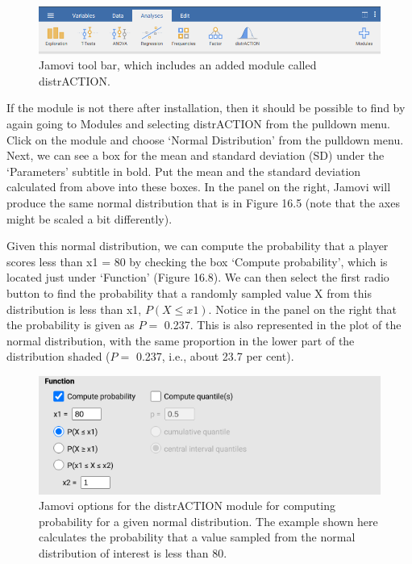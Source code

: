 \documentclass[
]{scrbook}
\begin{document}
\begin{figure}
\includegraphics[width=1\linewidth]{img/jamovi_toolbar_modules_distrACTION} \caption{Jamovi tool bar, which includes an added module called distrACTION.}\label{fig:unnamed-chunk-75}
\end{figure}

If the module is not there after installation, then it should be possible to find by again going to Modules and selecting distrACTION from the pulldown menu.
Click on the module and choose `Normal Distribution' from the pulldown menu.
Next, we can see a box for the mean and standard deviation (SD) under the `Parameters' subtitle in bold.
Put the mean and the standard deviation calculated from above into these boxes.
In the panel on the right, Jamovi will produce the same normal distribution that is in Figure 16.5 (note that the axes might be scaled a bit differently).

Given this normal distribution, we can compute the probability that a player scores less than x1 = 80 by checking the box `Compute probability', which is located just under `Function' (Figure 16.8).
We can then select the first radio button to find the probability that a randomly sampled value X from this distribution is less than x1, \(P(X \leq x1)\).
Notice in the panel on the right that the probability is given as \(P =\) 0.237.
This is also represented in the plot of the normal distribution, with the same proportion in the lower part of the distribution shaded (\(P =\) 0.237, i.e., about 23.7 per cent).

\begin{figure}
\includegraphics[width=0.8\linewidth]{img/jamovi_normal_distribution} \caption{Jamovi options for the distrACTION module for computing probability for a given normal distribution. The example shown here calculates the probability that a value sampled from the normal distribution of interest is less than 80.}\label{fig:unnamed-chunk-76}
\end{figure}
\end{document}
